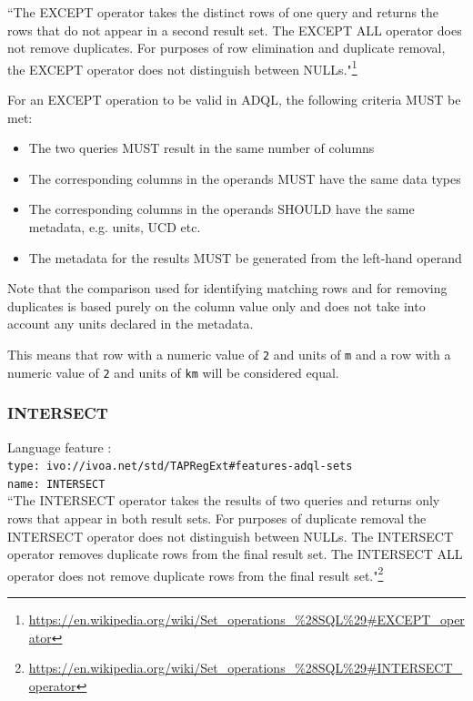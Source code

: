 \documentclass[11pt,a4paper]{ivoa}
\begin{document}
``The EXCEPT operator takes the distinct rows of one query and returns the
rows that do not appear in a second result set. The EXCEPT ALL operator
does not remove duplicates. For purposes of row elimination and duplicate
removal, the EXCEPT operator does not distinguish between NULLs."\footnote{\url{https://en.wikipedia.org/wiki/Set\_operations\_\%28SQL\%29\#EXCEPT\_operator}}

For an EXCEPT operation to be valid in ADQL, the following criteria MUST be met:

\begin{itemize}
    \item The two queries MUST result in the same number of columns
    \item The corresponding columns in the operands MUST have the same data types
    \item The corresponding columns in the operands SHOULD have the same metadata, e.g. units, UCD etc.
    \item The metadata for the results MUST be generated from the left-hand operand
\end{itemize}

Note that the comparison used for identifying matching rows and for removing
duplicates is based purely on the column value only and does not take into
account any units declared in the metadata.

This means that row with a numeric value of \verb:2: and units of \verb:m:
and a row with a numeric value of \verb:2: and units of \verb:km: will be
considered equal.

\subsubsection{INTERSECT}
{\footnotesize Language feature :}\\
{\footnotesize \verb|type: ivo://ivoa.net/std/TAPRegExt#features-adql-sets|}\\
{\footnotesize \verb|name: INTERSECT|}\\

``The INTERSECT operator takes the results of two queries and returns only
rows that appear in both result sets. For purposes of duplicate removal
the INTERSECT operator does not distinguish between NULLs. The INTERSECT
operator removes duplicate rows from the final result set. The INTERSECT
ALL operator does not remove duplicate rows from the final result set."\footnote{\url{https://en.wikipedia.org/wiki/Set\_operations\_\%28SQL\%29\#INTERSECT\_operator}}
\end{document}
